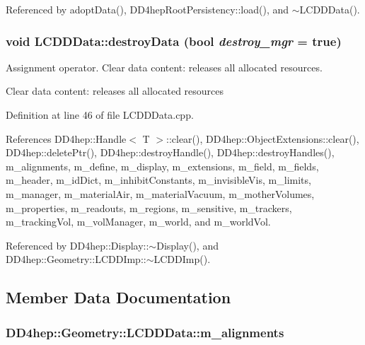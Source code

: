 Referenced by adoptData(), DD4hepRootPersistency::load(), and $\sim$LCDDData().\hypertarget{class_d_d4hep_1_1_geometry_1_1_l_c_d_d_data_a8c54de26155fec96a884f912f9c7a0ee}{
\subsubsection[{destroyData}]{\setlength{\rightskip}{0pt plus 5cm}void LCDDData::destroyData (bool {\em destroy\_\-mgr} = {\ttfamily true})}}
\label{class_d_d4hep_1_1_geometry_1_1_l_c_d_d_data_a8c54de26155fec96a884f912f9c7a0ee}


Assignment operator. Clear data content: releases all allocated resources.

Clear data content: releases all allocated resources 

Definition at line 46 of file LCDDData.cpp.

References DD4hep::Handle$<$ T $>$::clear(), DD4hep::ObjectExtensions::clear(), DD4hep::deletePtr(), DD4hep::destroyHandle(), DD4hep::destroyHandles(), m\_\-alignments, m\_\-define, m\_\-display, m\_\-extensions, m\_\-field, m\_\-fields, m\_\-header, m\_\-idDict, m\_\-inhibitConstants, m\_\-invisibleVis, m\_\-limits, m\_\-manager, m\_\-materialAir, m\_\-materialVacuum, m\_\-motherVolumes, m\_\-properties, m\_\-readouts, m\_\-regions, m\_\-sensitive, m\_\-trackers, m\_\-trackingVol, m\_\-volManager, m\_\-world, and m\_\-worldVol.

Referenced by DD4hep::Display::$\sim$Display(), and DD4hep::Geometry::LCDDImp::$\sim$LCDDImp().

\subsection{Member Data Documentation}
\hypertarget{class_d_d4hep_1_1_geometry_1_1_l_c_d_d_data_ad01e1162ee7ded020b446e0c0c5b64f2}{
\subsubsection[{m\_\-alignments}]{ {\bf DD4hep::Geometry::LCDDData::m\_\-alignments}}}
\label{class_d_d4hep_1_1_geometry_1_1_l_c_d_d_data_ad01e1162ee7ded020b446e0c0c5b64f2}


